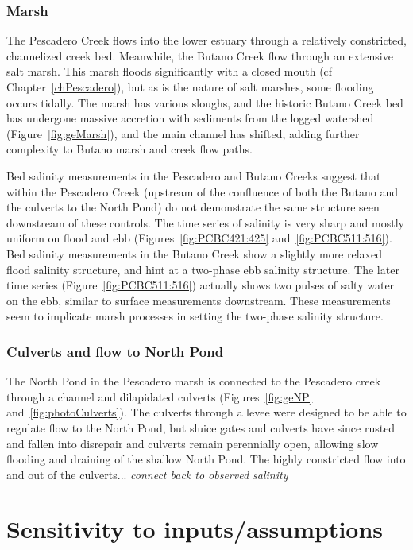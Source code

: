 \subsubsection{Marsh}
The Pescadero Creek flows into the lower estuary through a relatively constricted, channelized creek bed.  Meanwhile, the Butano Creek flow through an extensive salt marsh. This marsh floods significantly with a closed mouth (cf Chapter~\ref{chPescadero}), but as is the nature of salt marshes, some flooding occurs tidally. The marsh has various sloughs, and the historic Butano Creek bed has undergone massive accretion with sediments from the logged watershed (Figure~\ref{fig:geMarsh}), and the main channel has shifted, adding further complexity to Butano marsh and creek flow paths.

Bed salinity measurements in the Pescadero and Butano Creeks suggest that within the Pescadero Creek (upstream of the confluence of both the Butano and the culverts to the North Pond) do not demonstrate the same structure seen downstream of these controls. The time series of salinity is very sharp and mostly uniform on flood and ebb (Figures~\ref{fig:PCBC421:425} and~\ref{fig:PCBC511:516}). Bed salinity measurements in the Butano Creek show a slightly more relaxed flood salinity structure, and hint at a two-phase ebb salinity structure. The later time series (Figure~\ref{fig:PCBC511:516}) actually shows two pulses of salty water on the ebb, similar to surface measurements downstream. These measurements seem to implicate marsh processes in setting the two-phase salinity structure.

\subsubsection{Culverts and flow to North Pond}
The North Pond in the Pescadero marsh is connected to the Pescadero creek through a channel and dilapidated culverts (Figures~\ref{fig:geNP} and~\ref{fig:photoCulverts}). The culverts through a levee were designed to be able to regulate flow to the North Pond, but sluice gates and culverts have since rusted and fallen into disrepair and culverts remain perennially open, allowing slow flooding and draining of the shallow North Pond. The highly constricted flow into and out of the culverts... \emph{connect back to observed salinity}

\section{Sensitivity to inputs/assumptions} \label{sec:Sensitivity}

